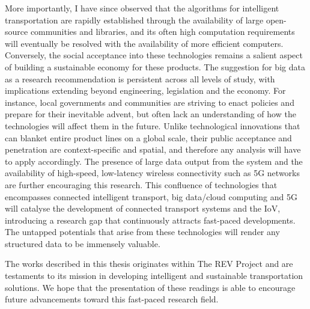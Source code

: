 More importantly, I have since observed that the algorithms for intelligent transportation are rapidly established through the availability of large open-source communities and libraries, and its often high computation requirements will eventually be resolved with the availability of more efficient computers. Conversely, the social acceptance into these technologies remains a salient aspect of building a sustainable economy for these products. The suggestion for big data as a research recommendation is persistent across all levels of study, with implications extending beyond engineering, legislation and the economy. For instance, local governments and communities are striving to enact policies and prepare for their inevitable advent, but often lack an understanding of how the technologies will affect them in the future. Unlike technological innovations that can blanket entire product lines on a global scale, their public acceptance and penetration are context-specific and spatial, and therefore any analysis will have to apply accordingly. The presence of large data output from the system and the availability of high-speed, low-latency wireless connectivity such as 5G networks are further encouraging this research. This confluence of technologies that encompasses connected intelligent transport, big data/cloud computing and 5G will catalyse the development of connected transport systems and the IoV, introducing a research gap that continuously attracts fast-paced developments. The untapped potentials that arise from these technologies will render any structured data to be immensely valuable.

The works described in this thesis originates within The REV Project and are testaments to its mission in developing intelligent and sustainable transportation solutions. We hope that the presentation of these readings is able to encourage future advancements toward this fast-paced research field.